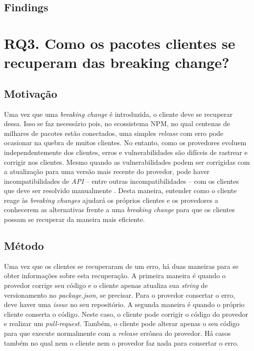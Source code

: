 \subsection{Findings}
\label{fin:rq2}

\section{RQ3. Como os pacotes clientes se recuperam das breaking change?}
\label{sec:rq3}

\subsection{Motivação}
\label{mot:rq3}
Uma vez que uma \textit{breaking change} é introduzida, o cliente deve se recuperar dessa. Isso se faz necessário pois, no ecossistema \gls{NPM}, no qual centenas de milhares de pacotes estão conectados, uma simples \textit{release} com erro pode ocasionar na quebra de muitos clientes. No entanto, como os provedores evoluem independentemente dos clientes, erros e vulnerabilidades são difíceis de rastrear e corrigir nos clientes. Mesmo quando as vulnerabilidades podem ser corrigidas com a atualização para uma versão mais recente do provedor, pode haver incompatibilidades de \textit{API} -- entre outras incompatibilidades -- com os clientes que deve ser resolvido manualmente \cite{Foo:2018:ESC:3236024.3275535}. Desta maneira, entender como o cliente reage às \textit{breaking changes} ajudará os próprios clientes e os provedores a conhecerem as alternativas frente a uma \textit{breaking change} para que os clientes possam se recuperar da maneira mais eficiente.

\subsection{Método}
\label{apr:rq3}
Uma vez que os clientes se recuperaram de um erro, há duas maneiras para se obter informações sobre esta recuperação. A primeira maneira é quando o provedor corrige seu código e o cliente apenas atualiza sua \textit{string} de versionamento no \textit{package.json}, se precisar. Para o provedor consertar o erro, deve haver uma \textit{issue} no seu repositório. A segunda maneira é quando o próprio cliente conserta o código. Neste caso, o cliente pode corrigir o código do provedor e realizar um \textit{pull-request}. Também, o cliente pode alterar apenas o seu código para que execute normalmente com a \textit{release} errônea do provedor. Há casos também no qual nem o cliente nem o provedor faz nada para consertar o erro.

